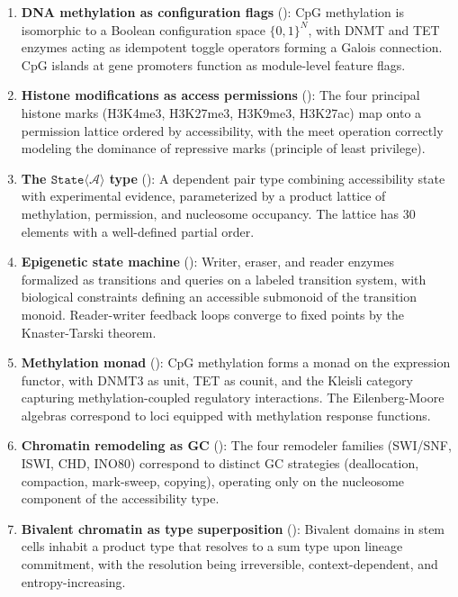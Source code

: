 \documentclass[12pt,a4paper]{article}
\newcommand{\StateT}{\texttt{State}}
\begin{document}
\begin{enumerate}
    \item \textbf{DNA methylation as configuration flags} (): CpG methylation is isomorphic to a Boolean configuration space $\{0,1\}^N$, with DNMT and TET enzymes acting as idempotent toggle operators forming a Galois connection. CpG islands at gene promoters function as module-level feature flags.

    \item \textbf{Histone modifications as access permissions} (): The four principal histone marks (H3K4me3, H3K27me3, H3K9me3, H3K27ac) map onto a permission lattice ordered by accessibility, with the meet operation correctly modeling the dominance of repressive marks (principle of least privilege).

    \item \textbf{The $\StateT\langle\mathcal{A}\rangle$ type} (): A dependent pair type combining accessibility state with experimental evidence, parameterized by a product lattice of methylation, permission, and nucleosome occupancy. The lattice has 30 elements with a well-defined partial order.

    \item \textbf{Epigenetic state machine} (): Writer, eraser, and reader enzymes formalized as transitions and queries on a labeled transition system, with biological constraints defining an accessible submonoid of the transition monoid. Reader-writer feedback loops converge to fixed points by the Knaster-Tarski theorem.

    \item \textbf{Methylation monad} (): CpG methylation forms a monad on the expression functor, with DNMT3 as unit, TET as counit, and the Kleisli category capturing methylation-coupled regulatory interactions. The Eilenberg-Moore algebras correspond to loci equipped with methylation response functions.

    \item \textbf{Chromatin remodeling as GC} (): The four remodeler families (SWI/SNF, ISWI, CHD, INO80) correspond to distinct GC strategies (deallocation, compaction, mark-sweep, copying), operating only on the nucleosome component of the accessibility type.

    \item \textbf{Bivalent chromatin as type superposition} (): Bivalent domains in stem cells inhabit a product type that resolves to a sum type upon lineage commitment, with the resolution being irreversible, context-dependent, and entropy-increasing.


\end{enumerate}
\end{document}
